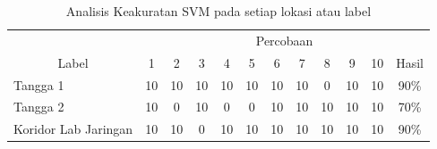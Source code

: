 \begin{enumerate}
	      \begin{table}[H]
		      \center
		      \caption{Analisis Keakuratan SVM pada setiap lokasi atau label}
		      \label{tabelpercobaansvm2}
		      \begin{tabular}{|lccccccccccc|}
			      \hline
			      \multicolumn{1}{|c|}{\cellcolor[HTML]{EFEFEF}}                        & \multicolumn{11}{c|}{\cellcolor[HTML]{EFEFEF}Percobaan}                                                                                                                                                                                                                                                   \\ \cline{2-12}
			      \multicolumn{1}{|c|}{\multirow{-2}{*}{\cellcolor[HTML]{EFEFEF}Label}} & \multicolumn{1}{c|}{1}                                  & \multicolumn{1}{c|}{2}  & \multicolumn{1}{c|}{3}  & \multicolumn{1}{c|}{4}  & \multicolumn{1}{c|}{5}  & \multicolumn{1}{c|}{6}  & \multicolumn{1}{c|}{7}  & \multicolumn{1}{c|}{8}  & \multicolumn{1}{c|}{9}  & \multicolumn{1}{c|}{10} & Hasil \\ \hline
			      \multicolumn{1}{|l|}{Tangga 1}                                        & \multicolumn{1}{c|}{10}                                 & \multicolumn{1}{c|}{10} & \multicolumn{1}{c|}{10} & \multicolumn{1}{c|}{10} & \multicolumn{1}{c|}{10} & \multicolumn{1}{c|}{10} & \multicolumn{1}{c|}{10} & \multicolumn{1}{c|}{0}  & \multicolumn{1}{c|}{10} & \multicolumn{1}{c|}{10} & 90\%  \\ \hline
			      \multicolumn{1}{|l|}{Tangga 2}                                        & \multicolumn{1}{c|}{10}                                 & \multicolumn{1}{c|}{0}  & \multicolumn{1}{c|}{10} & \multicolumn{1}{c|}{0}  & \multicolumn{1}{c|}{0}  & \multicolumn{1}{c|}{10} & \multicolumn{1}{c|}{10} & \multicolumn{1}{c|}{10} & \multicolumn{1}{c|}{10} & \multicolumn{1}{c|}{10} & 70\%  \\ \hline
			      \multicolumn{1}{|l|}{Koridor Lab Jaringan}                            & \multicolumn{1}{c|}{10}                                 & \multicolumn{1}{c|}{10} & \multicolumn{1}{c|}{0}  & \multicolumn{1}{c|}{10} & \multicolumn{1}{c|}{10} & \multicolumn{1}{c|}{10} & \multicolumn{1}{c|}{10} & \multicolumn{1}{c|}{10} & \multicolumn{1}{c|}{10} & \multicolumn{1}{c|}{10} & 90\%  \\ \hline

\end{tabular}
\end{table}
\end{enumerate}
